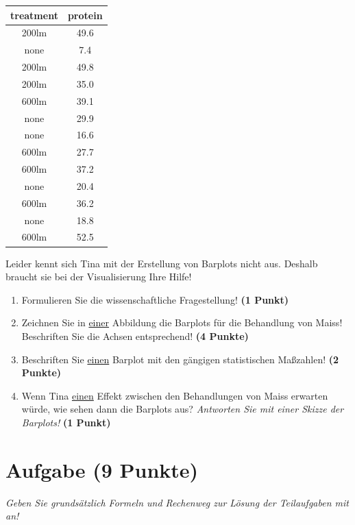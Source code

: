 \documentclass[a4paper, 9pt]{scrartcl}\usepackage[]{graphicx}\usepackage[]{xcolor}
\begin{document}
\begin{table}[!h]
\centering
\begin{tabular}{cc}
\toprule
treatment & protein\\
\midrule
200lm & 49.6\\
none & 7.4\\
200lm & 49.8\\
200lm & 35.0\\
600lm & 39.1\\
\addlinespace
none & 29.9\\
none & 16.6\\
600lm & 27.7\\
600lm & 37.2\\
none & 20.4\\
\addlinespace
600lm & 36.2\\
none & 18.8\\
600lm & 52.5\\
\bottomrule
\end{tabular}
\end{table}



Leider kennt sich Tina mit der Erstellung von Barplots nicht aus. Deshalb braucht sie bei der Visualisierung Ihre Hilfe!

\begin{enumerate}
\item Formulieren Sie die wissenschaftliche Fragestellung! \textbf{(1 Punkt)}
\item Zeichnen Sie in \underline{einer} Abbildung die Barplots für die Behandlung von Maiss! Beschriften Sie die Achsen entsprechend! \textbf{(4 Punkte)}
\item Beschriften Sie \underline{einen} Barplot mit den gängigen statistischen Maßzahlen! \textbf{(2 Punkte)}
\item Wenn Tina \underline{einen} Effekt zwischen den Behandlungen von Maiss erwarten würde, wie sehen dann die Barplots aus? \textit{Antworten Sie mit einer Skizze der Barplots!}
  \textbf{(1 Punkt)}
\end{enumerate} 
\clearpage

\section{Aufgabe \hfill (9 Punkte)}

\textit{Geben Sie grundsätzlich Formeln und Rechenweg zur Lösung der Teilaufgaben mit an!} \\[1Ex]
 
\end{document}
